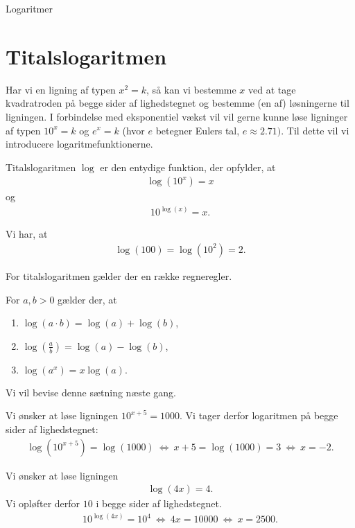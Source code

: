 
\begin{center}
\Huge
Logaritmer
\end{center}

\section*{Titalslogaritmen}
Har vi en ligning af typen $x^2 = k$, så kan vi bestemme $x$ ved at tage kvadratroden på begge sider af lighedstegnet og bestemme (en af) løsningerne til ligningen. I forbindelse med eksponentiel vækst
vil vil gerne kunne løse ligninger af typen $10^x = k$ og $e^x=k$  (hvor $e$ betegner Eulers tal, $e \approx 2.71)$. Til dette vil vi introducere logaritmefunktionerne. 

\begin{defn}[Titalslogaritmen]
	Titalslogaritmen $\log$ er den entydige funktion, der opfylder, at 
	\begin{align*}
		\log(10^x) = x
	\end{align*}
	og 
	\begin{align*}
		10^{\log(x)} = x.
	\end{align*}
\end{defn}

\begin{exa}
	Vi har, at 
	\begin{align*}
		\log(100) = \log(10^2) = 2.
	\end{align*}
\end{exa}

For titalslogaritmen gælder der en række regneregler. 
\begin{setn}[Logaritmeregneregler]
	For $a,b>0$ gælder der, at
	\begin{enumerate}[label=\roman*)]
		\item $\log(a\cdot b) = \log(a)+ \log(b)$,
		\item $\log\left(\frac{a}{b}\right) = \log(a)-\log(b)$,
		\item $\log(a^x) = x\log(a).$
	\end{enumerate}		
\end{setn}
Vi vil bevise denne sætning næste gang. 

\begin{exa}
	Vi ønsker at løse ligningen $10^{x+5} = 1000$. Vi tager derfor logaritmen på begge sider af lighedstegnet:
	\begin{align*}
		\log\left(10^{x+5}\right) = \log(1000) \ \Leftrightarrow \ x+5 = \log(1000) = 3 \ \Leftrightarrow	\ x = -2.
	\end{align*}	 
\end{exa}
\begin{exa}
	Vi ønsker at løse ligningen 
	\begin{align*}
		\log(4x) = 4. 
	\end{align*}
	Vi opløfter derfor $10$ i begge sider af lighedstegnet.
	\begin{align*}
		10^{\log(4x)} = 10^4 \ \Leftrightarrow \ 4x = 10000 \ \Leftrightarrow	\ x = 2500.
	\end{align*}
\end{exa}

